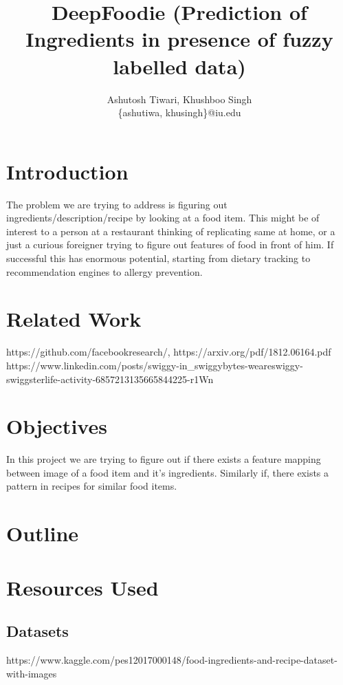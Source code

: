 \documentclass{article}
\title{DeepFoodie (Prediction of Ingredients in presence of fuzzy labelled data)}
\author{Ashutosh Tiwari, Khushboo Singh \\ \{ashutiwa, khusingh\}@iu.edu}
\begin{document}
\maketitle

\begin{abstract}

\end{abstract}

\section{Introduction}
The problem we are trying to address is figuring out ingredients/description/recipe by looking at a food item. This might be of interest to a person at a restaurant thinking of replicating same at home, or a just a curious foreigner trying to figure out features of food in front of him. If successful this has enormous potential, starting from dietary tracking to recommendation engines to allergy prevention.

\section{Related Work}
https://github.com/facebookresearch/, https://arxiv.org/pdf/1812.06164.pdf \\

https://www.linkedin.com/posts/swiggy-in_swiggybytes-weareswiggy-swiggsterlife-activity-6857213135665844225-r1Wn

\section{Objectives}
In this project we are trying to figure out if there exists a feature mapping between image of a food item and it's ingredients. Similarly if, there exists a pattern in recipes for similar food items. 


\section{Outline}

\section{Resources Used}
\subsection{Datasets}
https://www.kaggle.com/pes12017000148/food-ingredients-and-recipe-dataset-with-images
\end{document}
